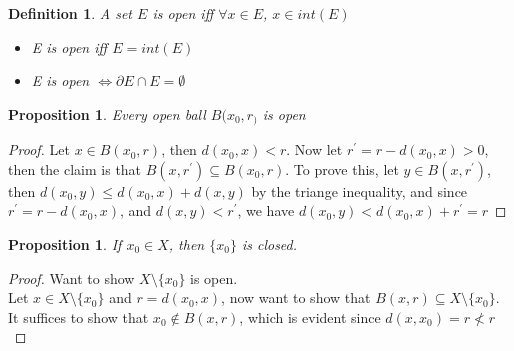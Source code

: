 \documentclass{article}
\newtheorem{definition}[theorem]{Definition}
\newtheorem{proposition}[theorem]{Proposition}
\begin{document}
\begin{definition}
    A set $E$ is open iff $\forall x \in E$, $x\in int(E)$
    \begin{itemize}
        \item E is open iff $E = int(E)$
        \item E is open $\Leftrightarrow \partial E \cap E  = \emptyset$
    \end{itemize}
\end{definition}

\begin{proposition}
    Every open ball $B(x_0, r_)$ is open
\end{proposition}
\begin{proof}
    Let $x\in B(x_0, r)$, then $d(x_0, x) < r$. Now let $r^{\prime} = r -d(x_0, x) > 0$,
    then the claim is that $B(x, r^{\prime}) \subseteq B(x_0, r)$. To prove this,
    let $y \in B(x, r^{\prime})$, then $d(x_0, y) \leq d(x_0, x) + d(x, y)$ by the
    triange inequality, and since $r^{\prime} = r - d(x_0, x)$, and
    $d(x,y) < r^{\prime}$, we have $d(x_0, y) < d(x_0, x) + r^{\prime} = r$
\end{proof}

\begin{proposition}
    If $x_0 \in X$, then $\{x_0\}$ is closed.
\end{proposition}
\begin{proof}
    Want to show $X\setminus\{x_0\}$ is open. \\
    Let $x \in X\setminus\{x_0\}$ and $r = d(x_0,x)$, now want to show that
    $B(x,r) \subseteq X\setminus\{x_0\}$. It suffices to show that
    $x_0 \not\in B(x,r)$, which is evident since $d(x,x_0) = r \not< r$
\end{proof}
\end{document}
